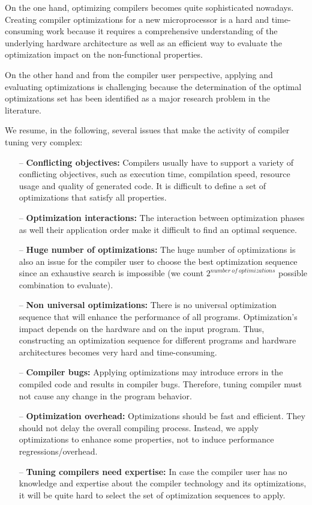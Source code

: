 On the one hand, optimizing compilers becomes quite sophisticated nowadays. Creating compiler optimizations for a new microprocessor is a hard and time-consuming work because it requires a comprehensive understanding of the underlying hardware architecture as well as an efficient way to evaluate the optimization impact on the non-functional properties. 

On the other hand and from the compiler user perspective, applying and evaluating optimizations is challenging because the determination of the optimal optimizations set has been identified as a major research problem in the literature\cite{knijnenburg2002iterative}.

We resume, in the following, several issues that make the activity of compiler tuning very complex:

\begin{itemize}
	\item[--] \textbf{Conflicting objectives:} Compilers usually have to support a variety of conflicting objectives, such as execution time, compilation speed, resource usage and quality of generated code. It is difficult to define a set of optimizations that satisfy all properties.
	
	\item[--] \textbf{Optimization interactions:} The interaction between optimization phases as well their application order make it difficult to find an optimal sequence.
	
	\item[--] \textbf{Huge number of optimizations:} The huge number of optimizations is also an issue for the compiler user to choose the best optimization sequence since an exhaustive search is impossible (we count $2^{number\ of\ optimizations}$ possible combination to evaluate).
	
	\item[--] \textbf{Non universal optimizations:} There is no  universal optimization sequence that will enhance the performance of all programs. Optimization's impact depends on the hardware and on the input program. Thus, constructing an optimization sequence for different programs and hardware architectures becomes very hard and time-consuming.
	
	\item[--] \textbf{Compiler bugs:} Applying optimizations may introduce errors in the compiled code and results in compiler bugs\cite{le2014compiler,yang2011finding}. Therefore, tuning compiler must not cause any change in the program behavior.
	
	\item[--] \textbf{Optimization overhead:} Optimizations should be fast and efficient. They should not delay the overall compiling process. Instead, we apply optimizations to enhance some properties, not to induce performance regressions/overhead.
	
	\item[--] \textbf{Tuning compilers need expertise:} In case the compiler user has no knowledge and expertise about the compiler technology and its optimizations, it will be quite hard to select the set of optimization sequences to apply.
\end{itemize}


